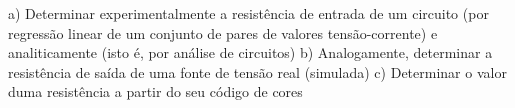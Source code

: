 \documentclass{article}
\begin{document}
a) Determinar experimentalmente a resistência de entrada de um circuito (por regressão
linear de um conjunto de pares de valores tensão-corrente) e analiticamente (isto é, por análise
de circuitos)
b) Analogamente, determinar a resistência de saída de uma fonte de tensão real
(simulada)
c) Determinar o valor duma resistência a partir do seu código de cores
\end{document}
